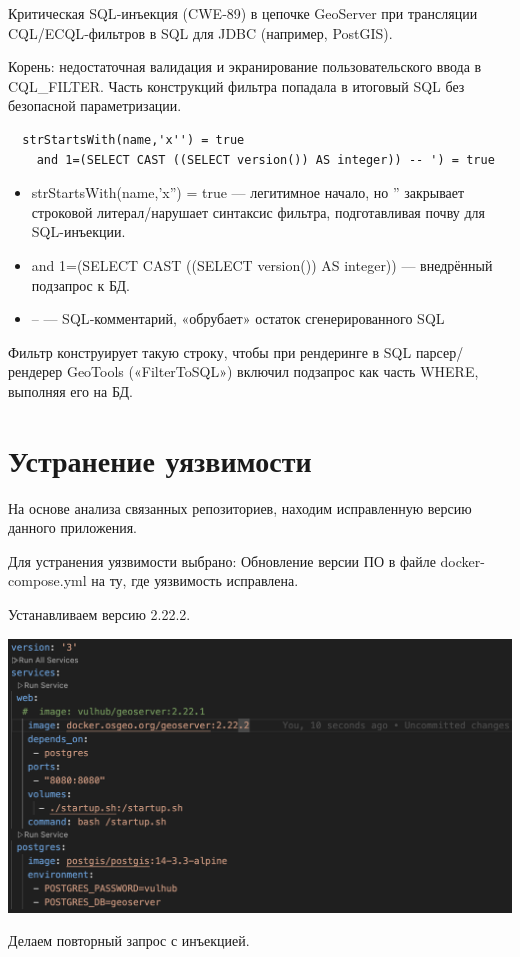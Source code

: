 \documentclass{article}
\begin{document}
Критическая SQL‑инъекция (CWE‑89) в цепочке GeoServer при трансляции CQL/ECQL‑фильтров в SQL для JDBC (например, PostGIS).

Корень: недостаточная валидация и экранирование пользовательского ввода в CQL\_FILTER. Часть конструкций фильтра попадала в итоговый SQL без безопасной параметризации.

\begin{lstlisting}
  strStartsWith(name,'x'') = true
    and 1=(SELECT CAST ((SELECT version()) AS integer)) -- ') = true
\end{lstlisting}

\begin{itemize}
  \item strStartsWith(name,'x'') = true — легитимное начало, но '' закрывает строковой литерал/нарушает синтаксис фильтра, подготавливая почву для SQL-инъекции.
  \item and 1=(SELECT CAST ((SELECT version()) AS integer)) — внедрённый подзапрос к БД.
  \item -- — SQL‑комментарий, «обрубает» остаток сгенерированного SQL
\end{itemize}

Фильтр конструирует такую строку, чтобы при рендеринге в SQL парсер/рендерер GeoTools («FilterToSQL») включил подзапрос как часть WHERE, выполняя его на БД.
\section{Устранение уязвимости}
На основе анализа связанных репозиториев, находим исправленную версию данного приложения.

Для устранения уязвимости выбрано: Обновление версии ПО в файле docker-compose.yml на ту, где уязвимость
исправлена.

Устанавливаем версию 2.22.2.
\begin{center}
  \includegraphics[width=.7\textwidth]{dok}
\end{center}
Делаем повторный запрос с инъекцией.
\end{document}
